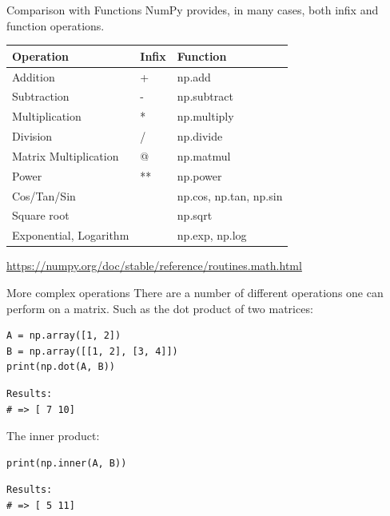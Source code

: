 \documentclass[10pt]{beamer}
\begin{document}
\begin{frame}[label={sec:orgba8e353}]{Comparison with Functions}
NumPy provides, in many cases, both infix and function operations.

\begin{center}
\begin{tabular}{lll}
Operation & Infix & Function\\
\hline
Addition & + & np.add\\
Subtraction & - & np.subtract\\
Multiplication & * & np.multiply\\
Division & / & np.divide\\
Matrix Multiplication & @ & np.matmul\\
Power & ** & np.power\\
Cos/Tan/Sin &  & np.cos, np.tan, np.sin\\
Square root &  & np.sqrt\\
Exponential, Logarithm &  & np.exp, np.log\\
\end{tabular}
\end{center}

\url{https://numpy.org/doc/stable/reference/routines.math.html}
\end{frame}

\begin{frame}[label={sec:org9fe014c},fragile]{More complex operations}
 There are a number of different operations one can perform on a matrix. Such as the
dot product of two matrices:

\begin{verbatim}
A = np.array([1, 2])
B = np.array([[1, 2], [3, 4]])
print(np.dot(A, B))
\end{verbatim}

\begin{verbatim}
Results: 
# => [ 7 10]
\end{verbatim}


The inner product:

\begin{verbatim}
print(np.inner(A, B))
\end{verbatim}

\begin{verbatim}
Results: 
# => [ 5 11]
\end{verbatim}
\end{frame}
\end{document}
